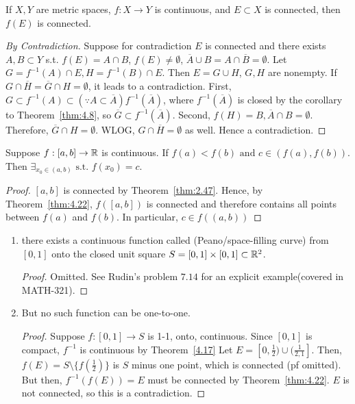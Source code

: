 \begin{theorem}[22]
	If $X,Y$ are metric spaces, $f:X\to Y$ is continuous, and $E \subset X$ is connected, then $f(E)$ is connected.
	\begin{proof}[By Contradiction]
		Suppose for contradiction $E$ is connected and there exists $A,B \subset Y$ s.t. $f(E)=A \cap  B$, $f(E) \neq \emptyset$, $\overline{A} \cup B=A \cap \overline{B}=\emptyset$.
		Let $G=f^{-1}(A) \cap E, H=f^{-1}(B)\cap E$. Then $E=G \cup H$, $G,H$ are nonempty.
		If $G \cap \overline{H}=\overline{G} \cap H=\emptyset$, it leads to a contradiction.
		First, $G \subset f^{-1}(A) \subset(\because A \subset \overline{A}) f^{-1}(\overline{A})$, where $f^{-1}(\overline{A})$ is closed by the corollary to Theorem~\ref{thm:4.8}, so $\overline{G} \subset f^{-1}(\overline{A})$.
		Second, $f(H)=B, \overline{A} \cap B=\emptyset$.
		Therefore, $\overline{G} \cap H =\emptyset$.
		WLOG, $G \cap \overline{H} = \emptyset$ as well.
		Hence a contradiction.
	\end{proof}
\end{theorem}

\begin{theorem}
	Suppose $f: [a,b]\to \mathbb{R}$ is continuous. If $f(a)<f(b) \text{ and } c \in (f(a),f(b))$. Then $\exists_{x_0 \in (a,b)} \text{ s.t. } f(x_0)=c$.
	\begin{proof}
		$[a,b]$ is connected by Theorem~\ref{thm:2.47}. Hence, by Theorem~\ref{thm:4.22}, $f([a,b])$ is connected and therefore contains all points between $f(a)$ and $f(b)$. In particular, $c \in f((a,b))$
	\end{proof}
\end{theorem}

\begin{example}
	\begin{enumerate}
		\item there exists a continuous function called (Peano/space-filling curve) from $[0,1]$ onto the closed unit square $S=[0,1]\times [0,1] \subset \mathbb{R}^2$.
		      \begin{proof}
			      Omitted. See Rudin's problem $7.14$ for an explicit example(covered in MATH-321).
		      \end{proof}
		\item But no such function can be one-to-one.
		      \begin{proof}
			      Suppose $f:[0,1]\to S$ is 1-1, onto, continuous. Since $[0,1]$ is compact, $f^{-1}$ is continuous by Theorem~\ref{4.17}
			      Let $E=[0,\frac{1}{2})\cup (\frac{1}{2,1}]$. Then, $f(E)=S\setminus \{f(\frac{1}{2})\}$ is $S$ minus one point, which is connected (pf omitted).
			      But then, $f^{-1}(f(E))=E$ must be connected by Theorem~\ref{thm:4.22}. $E$ is not connected, so this is a contradiction.
		      \end{proof}
	\end{enumerate}
\end{example}
